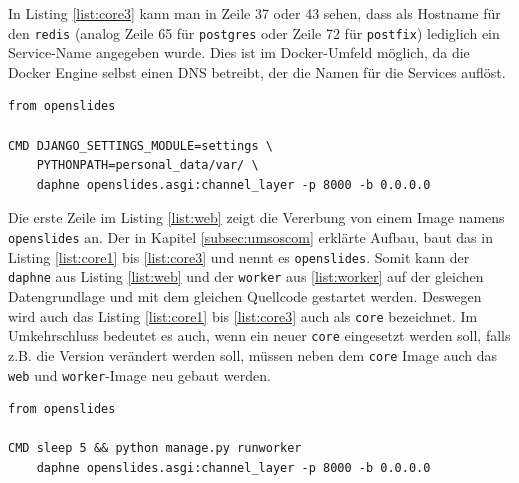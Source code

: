\documentclass[11pt,a4paper]{article}
\begin{document}
In Listing \ref{list:core3} kann man in Zeile 37 oder 43 sehen, dass als 
Hostname für den \texttt{redis} (analog Zeile 65 für \texttt{postgres} oder 
Zeile 72 für \texttt{postfix}) lediglich ein Service-Name angegeben wurde. Dies 
ist im Docker-Umfeld möglich, da die Docker Engine selbst einen DNS betreibt, 
der die Namen für die Services auflöst.
\begin{lstlisting}[firstnumber=1,
	caption=Dockerfile für den Bau des \texttt{web} - \cite{osdockcont},
	label={list:web}]
from openslides

CMD DJANGO_SETTINGS_MODULE=settings \
	PYTHONPATH=personal_data/var/ \
	daphne openslides.asgi:channel_layer -p 8000 -b 0.0.0.0 
\end{lstlisting}
Die erste Zeile im Listing \ref{list:web} zeigt die Vererbung von einem Image 
namens \texttt{openslides} an. Der in Kapitel \ref{subsec:umsoscom} erklärte 
Aufbau, baut das in Listing \ref{list:core1} bis \ref{list:core3} und nennt es 
\texttt{openslides}. Somit kann der \texttt{daphne} aus Listing \ref{list:web} 
und der \texttt{worker} aus \ref{list:worker} auf der gleichen Datengrundlage 
und mit dem gleichen Quellcode gestartet werden. Deswegen wird auch das Listing 
\ref{list:core1} bis \ref{list:core3} auch als \texttt{core} bezeichnet. Im 
Umkehrschluss bedeutet es auch, wenn ein neuer \texttt{core} eingesetzt werden 
soll, falls z.B. die Version verändert werden soll, müssen neben dem 
\texttt{core} Image auch das \texttt{web} und \texttt{worker}-Image neu gebaut 
werden.
\begin{lstlisting}[firstnumber=1,
	caption=Dockerfile für den Bau des \texttt{worker} - \cite{osdockcont},
	label={list:worker}]
from openslides

CMD sleep 5 && python manage.py runworker
	daphne openslides.asgi:channel_layer -p 8000 -b 0.0.0.0 
\end{lstlisting}
\newpage
\end{document}

